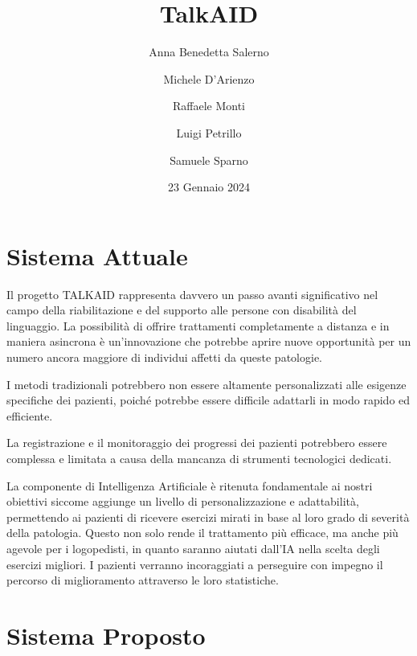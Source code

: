 \documentclass{article}
\begin{document}
    \title{TalkAID}
    \author{
        Anna Benedetta Salerno\\
        \and
        Michele D'Arienzo\\
        \and
        Raffaele Monti\\
        \and
        Luigi Petrillo\\
        \and
        Samuele Sparno\\
    }
    \date{23 Gennaio 2024}

    \maketitle
    \pagebreak
    \section{Sistema Attuale}

    Il progetto TALKAID rappresenta davvero un passo avanti significativo nel campo della riabilitazione e del supporto alle persone con disabilità del
    linguaggio. La possibilità di offrire trattamenti completamente a distanza e in maniera asincrona è un'innovazione che potrebbe aprire nuove opportunità
    per un numero ancora maggiore di individui affetti da queste patologie.

    I metodi tradizionali potrebbero non essere altamente personalizzati alle esigenze specifiche dei pazienti, poiché potrebbe essere difficile adattarli in
    modo rapido ed efficiente.

    La registrazione e il monitoraggio dei progressi dei pazienti potrebbero essere complessa e limitata a causa della mancanza di strumenti tecnologici
    dedicati.

    La componente di Intelligenza Artificiale è ritenuta fondamentale ai nostri obiettivi siccome aggiunge un livello di personalizzazione e adattabilità,
    permettendo ai pazienti di ricevere esercizi mirati in base al loro grado di severità della patologia. Questo non solo rende il trattamento più efficace,
    ma anche più agevole per i logopedisti, in quanto saranno aiutati dall'IA nella scelta degli esercizi migliori. I pazienti verranno incoraggiati a
    perseguire con impegno il percorso di miglioramento attraverso le loro statistiche.

    \section{Sistema Proposto}
\end{document}
